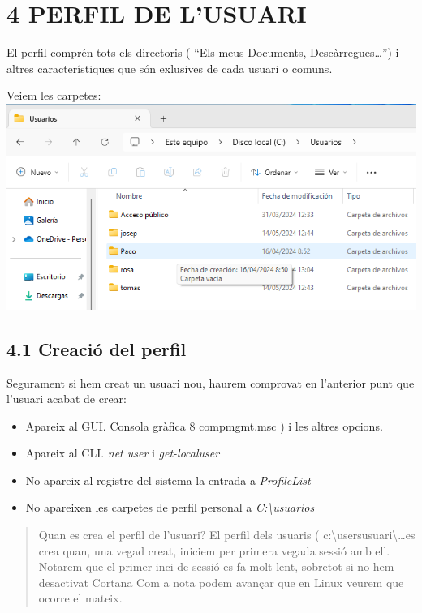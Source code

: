 \documentclass[
  a4paper,
]{article}
\providecommand{\tightlist}{%
  \setlength{\itemsep}{0pt}\setlength{\parskip}{0pt}}
\begin{document}
\section{4 PERFIL DE L'USUARI}\label{perfil-de-lusuari}

El perfil comprén tots els directoris ( ``Els meus Documents,
Descàrregues\ldots{}'') i altres característiques que són exlusives de
cada usuari o comuns.

Veiem les carpetes: \includegraphics{png/users.png}

\subsection{4.1 Creació del perfil}\label{creaciuxf3-del-perfil}

Segurament si hem creat un usuari nou, haurem comprovat en l'anterior
punt que l'usuari acabat de crear:

\begin{itemize}
\tightlist
\item
  Apareix al GUI. Consola gràfica 8 compmgmt.msc ) i les altres opcions.
\item
  Apareix al CLI. \emph{net user} i \emph{get-localuser}
\item
  No apareix al registre del sistema la entrada a \emph{ProfileList}
\item
  No apareixen les carpetes de perfil personal a
  \emph{C:\textbackslash usuarios}
\end{itemize}

\begin{quote}
Quan es crea el perfil de l'usuari? El perfil dels usuaris (
c:\textbackslash users\textbar usuari\textbackslash\ldots es crea quan,
una vegad creat, iniciem per primera vegada sessió amb ell. Notarem que
el primer inci de sessió es fa molt lent, sobretot si no hem desactivat
Cortana Com a nota podem avançar que en Linux veurem que ocorre el
mateix.
\end{quote}
\end{document}
